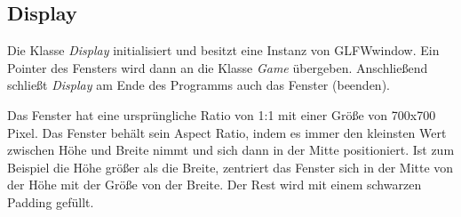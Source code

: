 \documentclass[doktyp=studarbeit]{TUBAFarbeiten}
\begin{document}
\subsection{Display}

Die Klasse \textit{Display} initialisiert und besitzt eine Instanz von GLFWwindow. 
Ein Pointer des Fensters wird dann an die Klasse \textit{Game} übergeben. 
Anschließend schließt \textit{Display} am Ende des Programms auch das Fenster 
(beenden).

Das Fenster hat eine ursprüngliche Ratio von 1:1 mit einer Größe von 700x700 Pixel.
Das Fenster behält sein Aspect Ratio, indem es immer den kleinsten Wert 
zwischen Höhe und Breite nimmt und sich dann in der Mitte positioniert. Ist zum Beispiel die Höhe größer als die Breite, zentriert das 
Fenster sich in der Mitte von der Höhe mit der Größe von der Breite. Der Rest
wird mit einem schwarzen Padding gefüllt.
\end{document}
